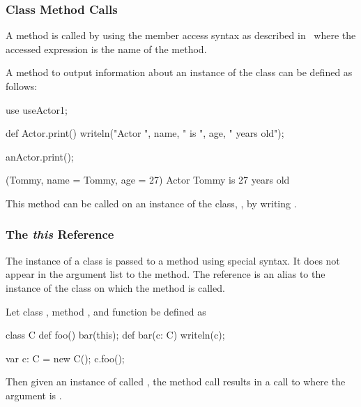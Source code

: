 \subsubsection{Class Method Calls}
\label{Class_Method_Calls}

A method is called by using the member access syntax as described
in~ where the accessed expression is
the name of the method.

\begin{example}
A method to output information about an instance of the 
class can be defined as follows:
\begin{chapelpre}
use useActor1;
\end{chapelpre}
\begin{chapel}
def Actor.print() {
  writeln("Actor ", name, " is ", age, " years old");
}
\end{chapel}
\begin{chapelpost}
anActor.print();
\end{chapelpost}
\begin{chapeloutput}
(Tommy, {name = Tommy, age = 27})
Actor Tommy is 27 years old
\end{chapeloutput}
This method can be called on an instance of the 
class, , by writing .
\end{example}

\subsubsection{The {\em this} Reference}
\label{The_em_this_Reference}

The instance of a class is passed to a method using special syntax.
It does not appear in the argument list to the method.  The
reference  is an alias to the instance of the class on
which the method is called.

\begin{example}
Let class , method , and function  be
defined as
\begin{chapelpre}
\end{chapelpre}
\begin{chapel}
class C {
  def foo() {
    bar(this);
  }
}
def bar(c: C) { writeln(c); }
\end{chapel}
\begin{chapelpost}
var c: C = new C();
c.foo();
\end{chapelpost}
\begin{chapeloutput}
{}
\end{chapeloutput}
Then given an instance of  called , the method
call  results in a call to  where the argument
is .
\end{example}

